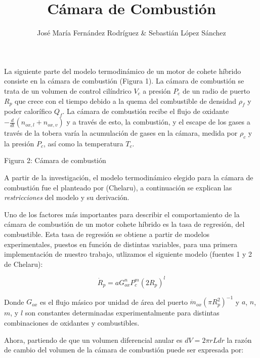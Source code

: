 \documentclass[12pt]{article}
\begin{document}

\title{Cámara de Combustión}
\author{José María Fernández Rodríguez \& Sebastián López Sánchez}

\maketitle

La siguiente parte del modelo termodinámico de un motor de cohete híbrido consiste en la cámara de combustión (Figura 1). La cámara de combustión se trata de un volumen de control cilíndrico $V_{c}$ a presión $P_{c}$ de un radio de puerto $R_{p}$ que crece con el tiempo debido a la quema del combustible de densidad $\rho_{f}$ y poder calorífico $Q_{f}$. La cámara de combustión recibe el flujo de oxidante $-\frac{d}{dt}(n_{ox,l}+n_{ox,v})$ y a través de esto, la combustión, y el escape de los gases a través de la tobera varía la acumulación de gases en la cámara, medida por $\rho_{c}$ y la presión $P_{c}$, así como la temperatura $T_{c}$. \par

Figura 2: Cámara de combustión \par

A partir de la investigación, el modelo termodinámico elegido para la cámara de combustión fue el planteado por (Chelaru), a continuación se explican las \emph{restricciones} del modelo y su derivación.

Uno de los factores más importantes para describir el comportamiento de la cámara de combustión de un motor cohete híbrido es la tasa de regresión, del combustible. Esta tasa de regresión se obtiene a partir de modelos experimentales, puestos en función de distintas variables, para una primera implementación de nuestro trabajo, utlizamos el siguiente modelo (fuentes 1 y 2 de Chelaru):

\begin{equation}
  \dot{R}_{p} = a G_{ox}^n P_{c}^m (2 R_{p})^l
  \label{regresion}
\end{equation}

Donde $G_{ox}$ es el flujo másico por unidad de área del puerto $\dot{m}_{ox}(\pi R_{p}^2)^{-1}$ y $a$, $n$, $m$, y $l$ son constantes determinadas experimentalmente para distintas combinaciones de oxidantes y combustibles.

Ahora, partiendo de que un volumen diferencial anular es $dV = 2 \pi r L dr$ la razón de cambio del volumen de la cámara de combustión puede ser expresada por:
\end{document}
